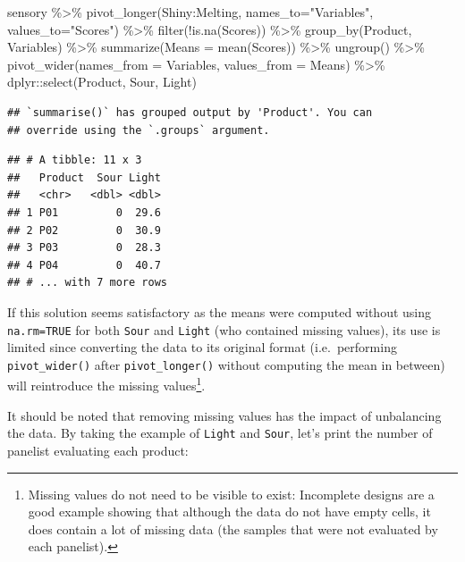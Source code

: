 \documentclass[
]{krantz}
\makeatletter
\newenvironment{Shaded}{\begin{snugshade}}{\end{snugshade}}
\newcommand{\AttributeTok}[1]{\textcolor[rgb]{0.61,0.61,0.61}{#1}}
\newcommand{\FunctionTok}[1]{\textcolor[rgb]{0,0,0}{#1}}
\newcommand{\NormalTok}[1]{#1}
\newcommand{\SpecialCharTok}[1]{\textcolor[rgb]{0,0,0}{#1}}
\newcommand{\StringTok}[1]{\textcolor[rgb]{0.5,0.5,0.5}{#1}}
\newenvironment{kframe}{%
\medskip{}
\setlength{\fboxsep}{.8em}
 \def\at@end@of@kframe{}%
 \ifinner\ifhmode%
  \def\at@end@of@kframe{\end{minipage}}%
  \begin{minipage}{\columnwidth}%
 \fi\fi%
 \def\FrameCommand##1{\hskip\@totalleftmargin \hskip-\fboxsep
 \colorbox{shadecolor}{##1}\hskip-\fboxsep
     \hskip-\linewidth \hskip-\@totalleftmargin \hskip\columnwidth}%
 \MakeFramed {\advance\hsize-\width
   \@totalleftmargin\z@ \linewidth\hsize
   \@setminipage}}%
 {\par\unskip\endMakeFramed%
 \at@end@of@kframe}
\renewenvironment{Shaded}{\begin{kframe}}{\end{kframe}}
\makeatother
\begin{document}
\begin{Shaded}
\begin{Highlighting}[]
\NormalTok{sensory }\SpecialCharTok{\%\textgreater{}\%} 
  \FunctionTok{pivot\_longer}\NormalTok{(Shiny}\SpecialCharTok{:}\NormalTok{Melting, }\AttributeTok{names\_to=}\StringTok{"Variables"}\NormalTok{, }\AttributeTok{values\_to=}\StringTok{"Scores"}\NormalTok{) }\SpecialCharTok{\%\textgreater{}\%} 
  \FunctionTok{filter}\NormalTok{(}\SpecialCharTok{!}\FunctionTok{is.na}\NormalTok{(Scores)) }\SpecialCharTok{\%\textgreater{}\%} 
  \FunctionTok{group\_by}\NormalTok{(Product, Variables) }\SpecialCharTok{\%\textgreater{}\%} 
  \FunctionTok{summarize}\NormalTok{(}\AttributeTok{Means =} \FunctionTok{mean}\NormalTok{(Scores)) }\SpecialCharTok{\%\textgreater{}\%} 
  \FunctionTok{ungroup}\NormalTok{() }\SpecialCharTok{\%\textgreater{}\%} 
  \FunctionTok{pivot\_wider}\NormalTok{(}\AttributeTok{names\_from =}\NormalTok{ Variables, }\AttributeTok{values\_from =}\NormalTok{ Means) }\SpecialCharTok{\%\textgreater{}\%} 
\NormalTok{  dplyr}\SpecialCharTok{::}\FunctionTok{select}\NormalTok{(Product, Sour, Light)}
\end{Highlighting}
\end{Shaded}

\begin{verbatim}
## `summarise()` has grouped output by 'Product'. You can
## override using the `.groups` argument.
\end{verbatim}

\begin{verbatim}
## # A tibble: 11 x 3
##   Product  Sour Light
##   <chr>   <dbl> <dbl>
## 1 P01         0  29.6
## 2 P02         0  30.9
## 3 P03         0  28.3
## 4 P04         0  40.7
## # ... with 7 more rows
\end{verbatim}

If this solution seems satisfactory as the means were computed without using \texttt{na.rm=TRUE} for both \texttt{Sour} and \texttt{Light} (who contained missing values), its use is limited since converting the data to its original format (i.e.~performing \texttt{pivot\_wider()} after \texttt{pivot\_longer()} without computing the mean in between) will reintroduce the missing values\footnote{Missing values do not need to be visible to exist: Incomplete designs are a good example showing that although the data do not have empty cells, it does contain a lot of missing data (the samples that were not evaluated by each panelist).}.

It should be noted that removing missing values has the impact of unbalancing the data. By taking the example of \texttt{Light} and \texttt{Sour}, let's print the number of panelist evaluating each product:
\end{document}
